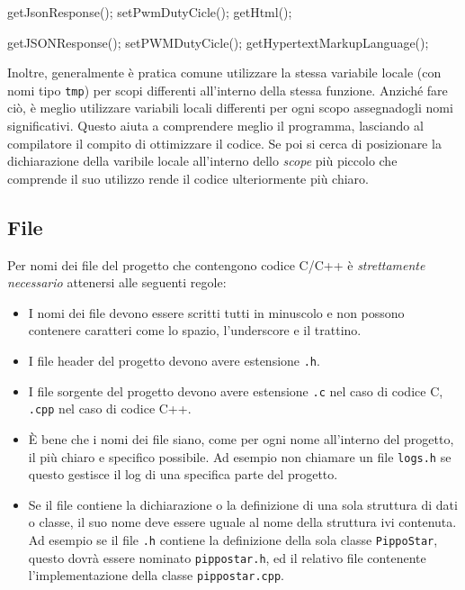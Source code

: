 \begin{minipage}[t]{\cbwidth}
\begin{RightCode}
getJsonResponse();
setPwmDutyCicle();
getHtml();
\end{RightCode}
\end{minipage}%
\hspace{\cbdistance}
\begin{minipage}[t]{\cbwidth}
\begin{ErrorCode}
getJSONResponse();
setPWMDutyCicle();
getHypertextMarkupLanguage();
\end{ErrorCode}
\end{minipage}

Inoltre, generalmente è pratica comune utilizzare la stessa variabile locale (con nomi tipo \texttt{tmp}) per scopi differenti all'interno della stessa funzione.
Anziché fare ciò, è meglio utilizzare variabili locali differenti per ogni scopo assegnadogli nomi significativi.
Questo aiuta a comprendere meglio il programma, lasciando al compilatore il compito di ottimizzare il codice.
Se poi si cerca di posizionare la dichiarazione della varibile locale all'interno dello \emph{scope} più piccolo che comprende il suo utilizzo rende il codice ulteriormente più chiaro.

\subsection{File}\label{ssec:filename}

Per nomi dei file del progetto che contengono codice C/C++ è \emph{strettamente necessario} attenersi alle seguenti regole:
\begin{itemize}
	\item I nomi dei file devono essere scritti tutti in minuscolo e non possono contenere caratteri come lo spazio, l'underscore e il trattino.
	\item I file header del progetto devono avere estensione \texttt{.h}.
	\item I file sorgente del progetto devono avere estensione \texttt{.c} nel caso di codice C, \texttt{.cpp} nel caso di codice C++.
	\item È bene che i nomi dei file siano, come per ogni nome all'interno del progetto, il più chiaro e specifico possibile.
		Ad esempio non chiamare un file \texttt{logs.h} se questo gestisce il log di una specifica parte del progetto.
	\item Se il file contiene la dichiarazione o la definizione di una sola struttura di dati o classe, il suo nome deve essere uguale al nome della struttura ivi contenuta.
		Ad esempio se il file \texttt{.h} contiene la definizione della sola classe \texttt{PippoStar}, questo dovrà essere nominato \texttt{pippostar.h}, ed il relativo file contenente l'implementazione della classe \texttt{pippostar.cpp}. 
\end{itemize}

